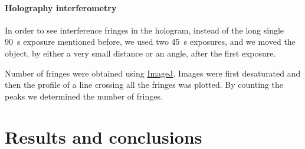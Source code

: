 \documentclass[11pt,a4paper]{article}
\begin{document}
\paragraph{Holography interferometry}
In order to see interference fringes in the hologram, instead of the long single \SI{90}{\second} exposure mentioned before, we used two \SI{45}{\second} exposures, and we moved the object, by either a very small distance or an angle, after the first exposure.

Number of fringes were obtained using \href{https://imagej.net/}{ImageJ}. Images were first desaturated and then the profile of a line crossing all the fringes was plotted. By counting the peaks we determined the number of fringes.


\section{Results and conclusions}
\end{document}
